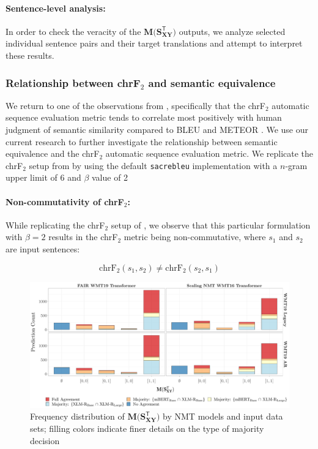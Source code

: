 \documentclass[11pt,a4paper]{article}
\begin{document}
\paragraph{Sentence-level analysis:} In order to check the veracity of the $\mathbf{M(S_{XY}^{\mathsf{T}}})$ outputs, we analyze selected individual sentence pairs and their target translations and attempt to interpret these results.

\subsubsection{Relationship between chrF$_2$ and semantic equivalence}

We return to one of the observations from \citet{michel2019evaluation}, specifically that the chrF$_2$ automatic sequence evaluation metric \cite{popovic2015chrf} tends to correlate most positively with human judgment of semantic similarity compared to BLEU \cite{papineni2002bleu} and METEOR \cite{denkowski2014meteor}. We use our current research to further investigate the relationship between semantic equivalence and the chrF$_2$ automatic sequence evaluation metric. We replicate the chrF$_2$ setup from \citet{michel2019evaluation} by using the default \texttt{sacrebleu} implementation \cite{post-2018-call} with a $n$-gram upper limit of 6 and $\beta$ value of 2

\paragraph{Non-commutativity of chrF$_2$:} While replicating the chrF$_2$ setup of \citet{michel2019evaluation}, we observe that this particular formulation with $\beta = 2$ results in the chrF$_2$ metric being non-commutative, where $s_1$ and $s_2$ are input sentences:

\begin{equation}
  \text{chrF}_{2}(s_1,s_2) \neq \text{chrF}_{2}(s_2,s_1)
\end{equation}

\begin{figure}
  \centering 
  \includegraphics[trim={0cm 0cm 0cm 0cm},clip,width=\textwidth]{paraphrase_detection_joint_decision.pdf}
  \caption{Frequency distribution of $\mathbf{M(S_{XY}^{\mathsf{T}}})$ by NMT models and input data sets; filling colors indicate finer details on the type of majority decision}
  \label{paraphrase_detection_joint_decision}
\end{figure}
\end{document}
